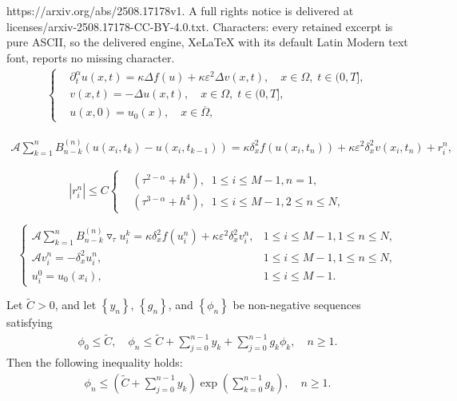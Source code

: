 \documentclass[10pt,a4paper]{amsart}
\begin{document}
https://arxiv.org/abs/2508.17178v1. A full rights notice is delivered at licenses/arxiv-2508.17178-CC-BY-4.0.txt. Characters: every retained excerpt is pure ASCII, so the delivered engine, XeLaTeX with its default Latin Modern text font, reports no missing character.
\begin{align}\label{eq.1.1}
\left\{
\begin{aligned}
  &\partial^\alpha_t u(x,t) = \kappa \Delta f(u)+\kappa \varepsilon^2 \Delta v(x,t),  \quad x\in\Omega,\; t\in(0,T], \\
  & v(x,t)=-\Delta u(x,t),  \quad x\in\Omega,\; t\in(0,T], \\
 &u(x,0) =u_0 (x), \quad x\in\overline{\Omega},
\end{aligned}
\right.
\end{align}

\begin{equation}\label{eq.3.3}
\begin{aligned}
\mathscr{A} \sum_{k=1}^{n}B_{n-k}^{(n)} \left(u(x_i,t_k)-u(x_i,t_{k-1}) \right) = \kappa \delta_x^2 f(u(x_i,t_{n})) + \kappa \varepsilon^2 \delta_x^2 v(x_i,t_{n}) + r_{i}^{n},
\end{aligned}
\end{equation}

\begin{equation}\label{eq.3.4}
\left|r_{i}^{n}\right| \leq C \left\{
\begin{aligned}
& \left(\tau^{2-\alpha}+h^4\right), \;\; 1\leq i \leq M-1, n=1, \\
& \left(\tau^{3-\alpha}+h^4\right), \;\; 1\leq i \leq M-1, 2\leq n \leq N,
\end{aligned}
\right.
\end{equation}

\begin{equation}\label{eq.3.5}
\begin{cases}\displaystyle
\mathscr{A} \sum\limits_{k=1}^{n}B_{n-k}^{(n)}
\triangledown_\tau u_i^k = \kappa \delta_x^2 f(u_i^n)
+ \kappa \varepsilon^2 \delta_x^2 v_i^n, & 1\leq i \leq M-1, 1\leq n \leq N, \\
\mathscr{A} v_i^n = -\delta_x^2 u_i^n, & 1\leq i \leq M-1, 1\leq n \leq N, \\
u_{i}^{0} = u_0(x_i), & 1\leq i \leq M-1.
\end{cases}
\end{equation}

\begin{lemma}\label{Le.4.6}
Let $\widetilde{C}>0$, and let $\left\{y_n\right\}$, $\left\{g_n\right\}$,
 and $\left\{\phi_n\right\}$ be non-negative sequences satisfying
\begin{align*}
\phi_{0}\leq \widetilde{C},\quad \phi_{n}\leq \widetilde{C}+\sum\limits_{j=0}^{n-1}y_{k}+\sum\limits_{j=0}^{n-1}g_{k}\phi_{k}, \quad n\geq 1.
\end{align*}
Then the following inequality holds:
\begin{align*}
\phi_n \leq \left(\widetilde{C}+\sum\limits_{j=0}^{n-1}y_{k} \right) \exp\left(\sum_{k=0}^{n-1}g_k\right), \quad n\geq 1.
\end{align*}
\end{lemma}
\end{document}
